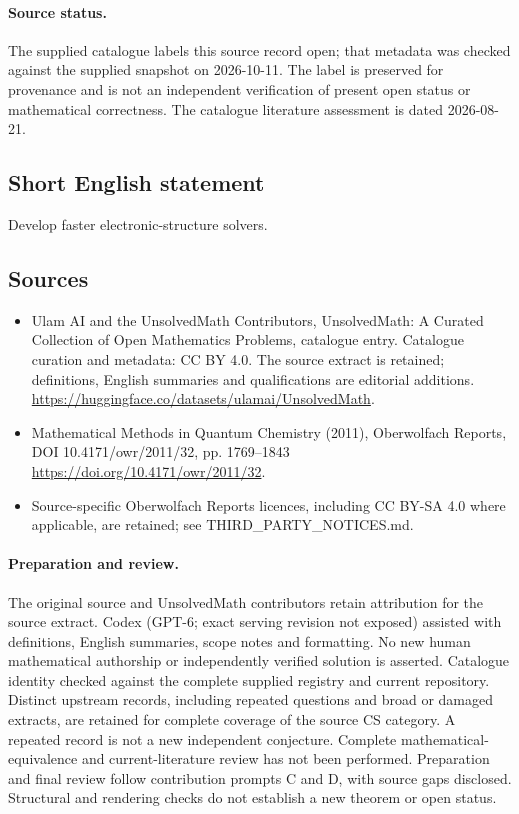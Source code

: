 \documentclass[11pt]{article}
\begin{document}
\paragraph{Source status.}
The supplied catalogue labels this source record open; that metadata was checked against the supplied snapshot on 2026-10-11. The label is preserved for provenance and is not an independent verification of present open status or mathematical correctness. The catalogue literature assessment is dated 2026-08-21.
\subsection{Short English statement}
Develop faster electronic-structure solvers.
\subsection{Sources}
\begin{itemize}
\item[S1] Ulam AI and the UnsolvedMath Contributors, UnsolvedMath: A Curated Collection of Open Mathematics Problems, catalogue entry. Catalogue curation and metadata: CC BY 4.0. The source extract is retained; definitions, English summaries and qualifications are editorial additions.
\url{https://huggingface.co/datasets/ulamai/UnsolvedMath}.
\item[S2] Mathematical Methods in Quantum Chemistry (2011), Oberwolfach Reports, DOI 10.4171/owr/2011/32, pp. 1769--1843
\url{https://doi.org/10.4171/owr/2011/32}.
\item Source-specific Oberwolfach Reports licences, including CC BY-SA 4.0 where applicable, are retained; see THIRD\_PARTY\_NOTICES.md.
\end{itemize}
\paragraph{Preparation and review.}
The original source and UnsolvedMath contributors retain attribution for the source extract. Codex (GPT-6; exact serving revision not exposed) assisted with definitions, English summaries, scope notes and formatting. No new human mathematical authorship or independently verified solution is asserted. Catalogue identity checked against the complete supplied registry and current repository. Distinct upstream records, including repeated questions and broad or damaged extracts, are retained for complete coverage of the source CS category. A repeated record is not a new independent conjecture. Complete mathematical-equivalence and current-literature review has not been performed. Preparation and final review follow contribution prompts C and D, with source gaps disclosed. Structural and rendering checks do not establish a new theorem or open status.
\label{end:statement}
\end{document}
